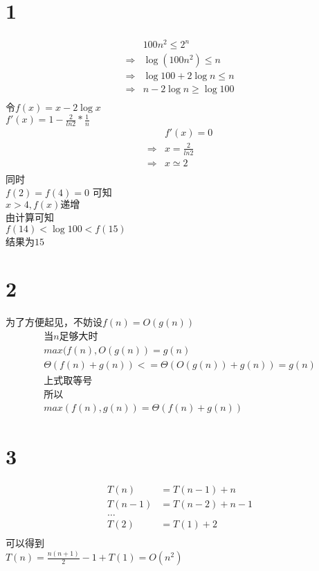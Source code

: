 \documentclass[a4paper]{article}
\begin{document}
\section*{1}

\begin{align*}
 & 100n^2 \le  2^n \\
 \Rightarrow & \log(100n^2) \le n \\
 \Rightarrow & \log100 + 2\log n \le n \\
 \Rightarrow & n - 2\log n \ge \log100 \\
\end{align*}
令$f(x)= x-2\log x$ \\
$f'(x)=1-\frac{2}{ln2}*\frac1n$ \\
\begin{align*}
& f'(x) = 0 \\
\Rightarrow & x = \frac{2}{ln2} \\ 
\Rightarrow & x \simeq 2 \\
\end{align*}
同时 \\
$f(2)=f(4)=0$ 可知\\
$x>4,f(x)递增$\\
由计算可知\\
$f(14)<\log100<f(15)$\\
结果为$15$

\section*{2}
为了方便起见，不妨设$f(n)=O(g(n))$\\
\begin{align*}
当n足够大时\\
max(f(n),O(g(n))=g(n)\\
\Theta(f(n)+g(n))<=\Theta(O(g(n))+g(n))=g(n)\\
上式取等号\\
所以\\
max(f(n),g(n))=\Theta(f(n)+g(n))
\end{align*}

\section*{3}
\begin{align*}
T(n) &= T(n-1) + n \\
T(n-1) &= T(n-2) + n - 1 \\
\ldots \\
T(2) &= T(1) + 2\\
\end{align*}
可以得到\\
$T(n)=\frac{n(n+1)}{2}-1+T(1)=O(n^2)$
\end{document}
